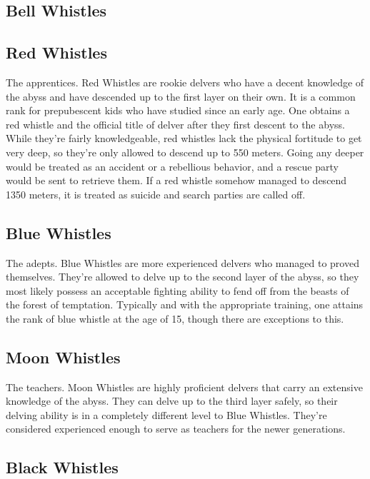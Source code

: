 \documentclass[letterpaper,10pt,twoside,twocolumn,openany]{book}
\begin{document}

\subsection{Bell Whistles}

\subsection{Red Whistles}

The apprentices. Red Whistles are rookie delvers who have a decent knowledge of the abyss and have descended up to the first layer on their own. It is a common rank for prepubescent kids who have studied since an early age. One obtains a red whistle and the official title of delver after they first descent to the abyss. While they're fairly knowledgeable, red whistles lack the physical fortitude to get very deep, so they're only allowed to descend up to 550 meters. Going any deeper would be treated as an accident or a rebellious behavior, and a rescue party would be sent to retrieve them. If a red whistle somehow managed to descend 1350 meters, it is treated as suicide and search parties are called off. 

\subsection{Blue Whistles}

The adepts. Blue Whistles are more experienced delvers who managed to proved themselves. They're allowed to delve up to the second layer of the abyss, so they most likely possess an acceptable fighting ability to fend off from the beasts of the forest of temptation. Typically and with the appropriate training, one attains the rank of blue whistle at the age of 15, though there are exceptions to this. 

\subsection{Moon Whistles}

The teachers. Moon Whistles are highly proficient delvers that carry an extensive knowledge of the abyss. They can delve up to the third layer safely, so their delving ability is in a completely different level to Blue Whistles. They're considered experienced enough to serve as teachers for the newer generations. 

\subsection{Black Whistles}
\end{document}
